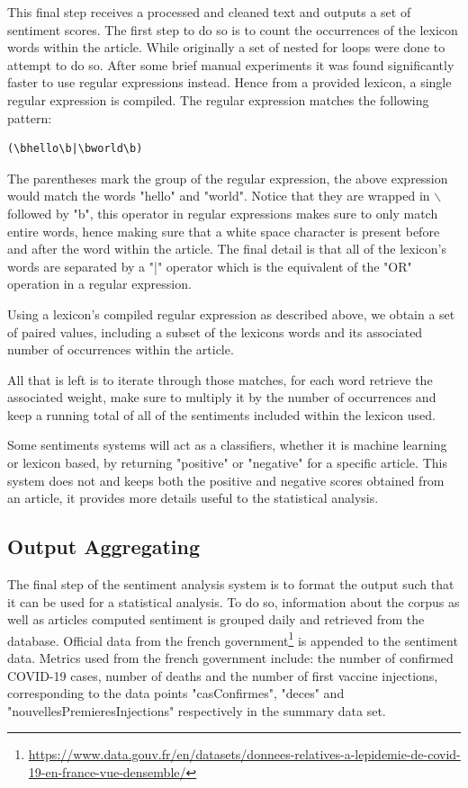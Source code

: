 This final step receives a processed and cleaned text and outputs a set of sentiment scores. The first step to do so is to count the occurrences of the lexicon words within the article. While originally a set of nested for loops were done to attempt to do so. After some brief manual experiments it was found significantly faster to use regular expressions instead. Hence from a provided lexicon, a single regular expression is compiled. The regular expression matches the following pattern:
\begin{center}
\begin{verbatim}(\bhello\b|\bworld\b)\end{verbatim}
\end{center}

The parentheses mark the group of the regular expression, the above expression would match the words "hello" and "world". Notice that they are wrapped in $\backslash$ followed by "b", this operator in regular expressions makes sure to only match entire words, hence making sure that a white space character is present before and after the word within the article. The final detail is that all of the lexicon's words are separated by a "|" operator which is the equivalent of the "OR" operation in a regular expression.

Using a lexicon's compiled regular expression as described above, we obtain a set of paired values, including a subset of the lexicons words and its associated number of occurrences within the article.

All that is left is to iterate through those matches, for each word retrieve the associated weight, make sure to multiply it by the number of occurrences and keep a running total of all of the sentiments included within the lexicon used.

Some sentiments systems will act as a classifiers, whether it is machine learning or lexicon based, by returning "positive" or "negative" for a specific article. This system does not and keeps both the positive and negative scores obtained from an article, it provides more details useful to the statistical analysis.

\subsection{Output Aggregating}

The final step of the sentiment analysis system is to format the output such that it can be used for a statistical analysis. To do so, information about the corpus as well as articles computed sentiment is grouped daily and retrieved from the database. Official data from the french government\footnote{\url{https://www.data.gouv.fr/en/datasets/donnees-relatives-a-lepidemie-de-covid-19-en-france-vue-densemble/}} is appended to the sentiment data. Metrics used from the french government include: the number of confirmed COVID-19 cases, number of deaths and the number of first vaccine injections, corresponding to the data points "casConfirmes", "deces" and "nouvellesPremieresInjections" respectively in the summary data set.

